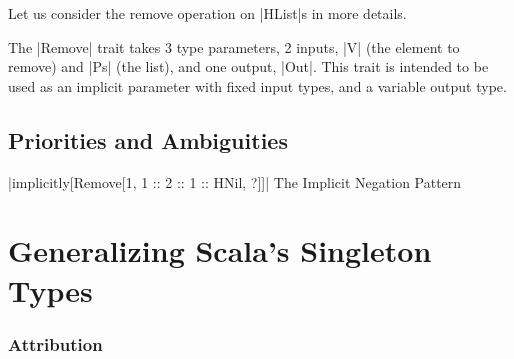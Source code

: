 Let us consider the remove operation on |HList|s in more details.

\memImplicitRemove



\noindent
The |Remove| trait takes 3 type parameters, 2 inputs, |V| (the element to remove) and |Ps| (the list), and one output, |Out|.
This trait is intended to be used as an implicit parameter with fixed input types, and a variable output type.




\section{Priorities and Ambiguities}

|implicitly[Remove[1, 1 :: 2 :: 1 :: HNil, ?]]|
The Implicit Negation Pattern

\chapter{Generalizing Scala's Singleton Types}
\label{chap:generalizing-scala-s-singleton-types}
\subsection*{Attribution}
\citep{shmid2020coming}
\lipsum[1]


